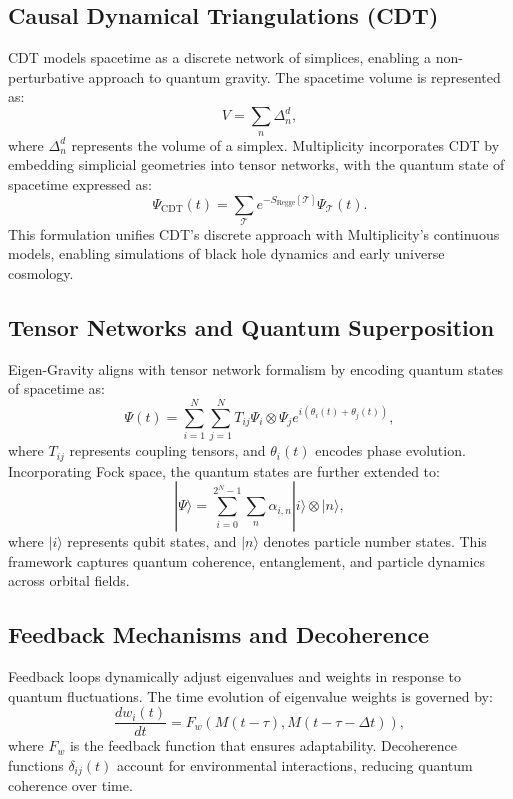 \documentclass[12]{amsart}
\theoremstyle{plain}
\begin{document}
\subsection{Causal Dynamical Triangulations (CDT)}
CDT models spacetime as a discrete network of simplices, enabling a non-perturbative approach to quantum gravity. The spacetime volume is represented as:
\begin{equation}
    V = \sum_{n} \Delta_n^d,
\end{equation}
where \( \Delta_n^d \) represents the volume of a simplex. Multiplicity incorporates CDT by embedding simplicial geometries into tensor networks, with the quantum state of spacetime expressed as:
\begin{equation}
    \Psi_{\text{CDT}}(t) = \sum_{\mathcal{T}} e^{-S_{\text{Regge}}[\mathcal{T}]} \Psi_{\mathcal{T}}(t).
\end{equation}
This formulation unifies CDT’s discrete approach with Multiplicity’s continuous models, enabling simulations of black hole dynamics and early universe cosmology.

\subsection{Tensor Networks and Quantum Superposition}
Eigen-Gravity aligns with tensor network formalism by encoding quantum states of spacetime as:
\begin{equation}
    \Psi(t) = \sum_{i=1}^{N} \sum_{j=1}^{N} T_{ij} \Psi_i \otimes \Psi_j e^{i(\theta_i(t) + \theta_j(t))},
\end{equation}
where \( T_{ij} \) represents coupling tensors, and \( \theta_i(t) \) encodes phase evolution. Incorporating Fock space, the quantum states are further extended to:
\begin{equation}
    |\Psi\rangle = \sum_{i=0}^{2^N - 1} \sum_{n} \alpha_{i,n} |i\rangle \otimes |n\rangle,
\end{equation}
where \( |i\rangle \) represents qubit states, and \( |n\rangle \) denotes particle number states. This framework captures quantum coherence, entanglement, and particle dynamics across orbital fields.
\subsection{Feedback Mechanisms and Decoherence}
Feedback loops dynamically adjust eigenvalues and weights in response to quantum fluctuations. The time evolution of eigenvalue weights is governed by:
\begin{equation}
    \frac{d w_i(t)}{dt} = F_w(M(t - \tau), M(t - \tau - \Delta t)),
\end{equation}
where \( F_w \) is the feedback function that ensures adaptability. Decoherence functions \( \delta_{ij}(t) \) account for environmental interactions, reducing quantum coherence over time.
\end{document}
